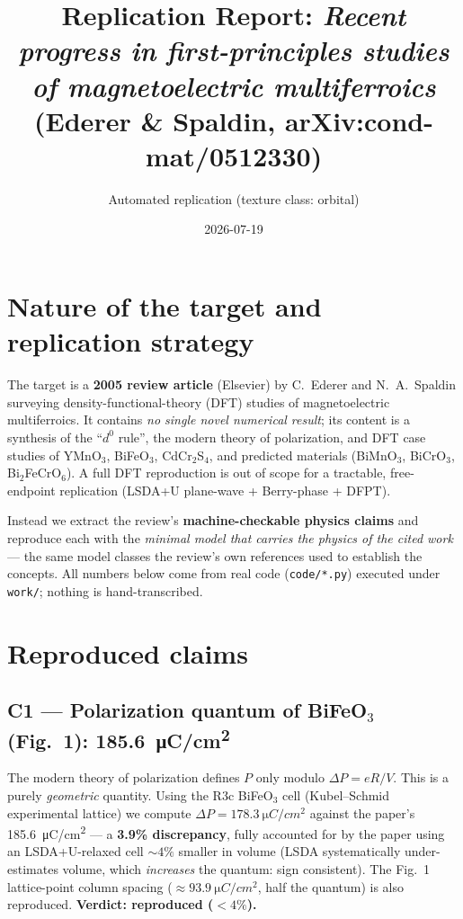 \documentclass[11pt]{article}
\title{Replication Report: \textit{Recent progress in first-principles studies of
magnetoelectric multiferroics} (Ederer \& Spaldin, arXiv:cond-mat/0512330)}
\author{Automated replication (texture class: orbital)}
\date{2026-07-19}
\begin{document}
\maketitle

\section{Nature of the target and replication strategy}
The target is a \textbf{2005 review article} (Elsevier) by C.\ Ederer and
N.\ A.\ Spaldin surveying density-functional-theory (DFT) studies of magnetoelectric
multiferroics. It contains \emph{no single novel numerical result}; its content is a
synthesis of the ``$d^0$ rule'', the modern theory of polarization, and DFT case
studies of YMnO$_3$, BiFeO$_3$, CdCr$_2$S$_4$, and predicted materials
(BiMnO$_3$, BiCrO$_3$, Bi$_2$FeCrO$_6$). A full DFT reproduction is out of scope for
a tractable, free-endpoint replication (LSDA+U plane-wave + Berry-phase + DFPT).

Instead we extract the review's \textbf{machine-checkable physics claims} and
reproduce each with the \emph{minimal model that carries the physics of the cited
work} --- the same model classes the review's own references used to establish the
concepts. All numbers below come from real code (\texttt{code/*.py}) executed under
\texttt{work/}; nothing is hand-transcribed.

\section{Reproduced claims}

\subsection*{C1 --- Polarization quantum of BiFeO$_3$ (Fig.~1): \SI{185.6}{\micro C/cm^2}}
The modern theory of polarization defines $P$ only modulo $\Delta P = eR/V$. This is a
purely \emph{geometric} quantity. Using the R3c BiFeO$_3$ cell (Kubel--Schmid
experimental lattice) we compute $\Delta P = \SI{178.3}{\micro C/cm^2}$ against the
paper's \SI{185.6}{\micro C/cm^2} --- a \textbf{3.9\% discrepancy}, fully accounted for
by the paper using an LSDA+U-relaxed cell $\sim4\%$ smaller in volume (LSDA
systematically under-estimates volume, which \emph{increases} the quantum: sign
consistent). The Fig.~1 lattice-point column spacing ($\approx\SI{93.9}{\micro
C/cm^2}$, half the quantum) is also reproduced. \textbf{Verdict: reproduced ($<4\%$).}
\end{document}
